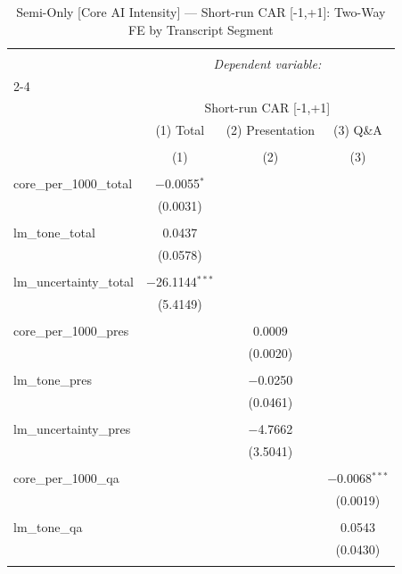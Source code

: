 
\begin{table}[!htbp] \centering 
  \caption{Semi-Only [Core AI Intensity] — Short-run CAR [-1,+1]: Two-Way FE by Transcript Segment} 
  \label{} 
\begin{tabular}{@{\extracolsep{5pt}}lccc} 
\\[-1.8ex]\hline 
\hline \\[-1.8ex] 
 & \multicolumn{3}{c}{\textit{Dependent variable:}} \\ 
\cline{2-4} 
\\[-1.8ex] & \multicolumn{3}{c}{Short-run CAR [-1,+1]} \\ 
 & (1) Total & (2) Presentation & (3) Q\&A \\ 
\\[-1.8ex] & (1) & (2) & (3)\\ 
\hline \\[-1.8ex] 
 core\_per\_1000\_total & $-$0.0055$^{*}$ &  &  \\ 
  & (0.0031) &  &  \\ 
  & & & \\ 
 lm\_tone\_total & 0.0437 &  &  \\ 
  & (0.0578) &  &  \\ 
  & & & \\ 
 lm\_uncertainty\_total & $-$26.1144$^{***}$ &  &  \\ 
  & (5.4149) &  &  \\ 
  & & & \\ 
 core\_per\_1000\_pres &  & 0.0009 &  \\ 
  &  & (0.0020) &  \\ 
  & & & \\ 
 lm\_tone\_pres &  & $-$0.0250 &  \\ 
  &  & (0.0461) &  \\ 
  & & & \\ 
 lm\_uncertainty\_pres &  & $-$4.7662 &  \\ 
  &  & (3.5041) &  \\ 
  & & & \\ 
 core\_per\_1000\_qa &  &  & $-$0.0068$^{***}$ \\ 
  &  &  & (0.0019) \\ 
  & & & \\ 
 lm\_tone\_qa &  &  & 0.0543 \\ 
  &  &  & (0.0430) \\ 
  & & & \\ 

\end{tabular}
\end{table}
